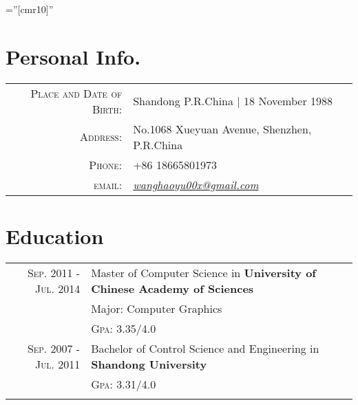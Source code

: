 \documentclass[a4paper,10pt]{article} %
\begin{document}
\pagestyle{empty} %

\font\fb=''[cmr10]'' %


\par{\bigskip\par} %

\section{Personal Info.}

\begin{tabular}{rl}
\textsc{Place and Date of Birth:} & Shandong P.R.China  | 18 November 1988 \\
\textsc{Address:} & No.1068 Xueyuan Avenue, Shenzhen, P.R.China \\
\textsc{Phone:} & +86 18665801973\\
\textsc{email:} & \href{mailto:wanghaoyu00x@gmail.com}{\emph{wanghaoyu00x@gmail.com}}
\end{tabular}


\section{Education}

\begin{tabular}{rl}	
\textsc{Sep. 2011 - Jul. 2014} & Master of Computer Science in \textbf{University of Chinese Academy of Sciences}\\
& Major: Computer Graphics\\
& \textsc{Gpa}: 3.35/4.0 \\


\textsc{Sep. 2007 - Jul. 2011} & Bachelor of Control Science and Engineering in \textbf{Shandong University} \\
&\normalsize \textsc{Gpa}: 3.31/4.0 \\
&\\


\end{tabular}
\end{document}
